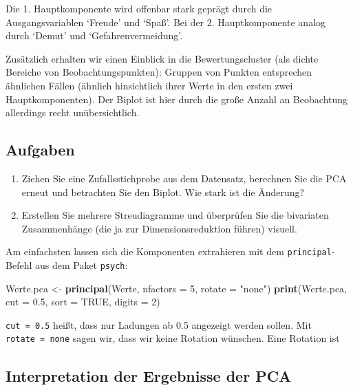 \documentclass[12pt,ngerman,]{book}
\makeatletter
\newenvironment{Shaded}{\begin{snugshade}}{\end{snugshade}}
\newcommand{\KeywordTok}[1]{\textcolor[rgb]{0.13,0.29,0.53}{\textbf{#1}}}
\newcommand{\DataTypeTok}[1]{\textcolor[rgb]{0.13,0.29,0.53}{#1}}
\newcommand{\DecValTok}[1]{\textcolor[rgb]{0.00,0.00,0.81}{#1}}
\newcommand{\FloatTok}[1]{\textcolor[rgb]{0.00,0.00,0.81}{#1}}
\newcommand{\StringTok}[1]{\textcolor[rgb]{0.31,0.60,0.02}{#1}}
\newcommand{\OtherTok}[1]{\textcolor[rgb]{0.56,0.35,0.01}{#1}}
\newcommand{\NormalTok}[1]{#1}
\newenvironment{kframe}{%
\medskip{}
\setlength{\fboxsep}{.8em}
 \def\at@end@of@kframe{}%
 \ifinner\ifhmode%
  \def\at@end@of@kframe{\end{minipage}}%
  \begin{minipage}{\columnwidth}%
 \fi\fi%
 \def\FrameCommand##1{\hskip\@totalleftmargin \hskip-\fboxsep
 \colorbox{shadecolor}{##1}\hskip-\fboxsep
     \hskip-\linewidth \hskip-\@totalleftmargin \hskip\columnwidth}%
 \MakeFramed {\advance\hsize-\width
   \@totalleftmargin\z@ \linewidth\hsize
   \@setminipage}}%
 {\par\unskip\endMakeFramed%
 \at@end@of@kframe}
\renewenvironment{Shaded}{\begin{kframe}}{\end{kframe}}
\theoremstyle{definition}
\theoremstyle{definition}
\theoremstyle{remark}
\let\BeginKnitrBlock\begin \let\EndKnitrBlock\end
\makeatother
\begin{document}
Die 1. Hauptkomponente wird offenbar stark geprägt durch die
Ausgangsvariablen `Freude' und `Spaß'. Bei der 2. Hauptkomponente analog
durch `Demut' und `Gefahrenvermeidung'.

Zusätzlich erhalten wir einen Einblick in die Bewertungscluster (als
dichte Bereiche von Beobachtungspunkten): Gruppen von Punkten
entsprechen ähnlichen Fällen (ähnlich hinsichtlich ihrer Werte in den
ersten zwei Hauptkomponenten). Der Biplot ist hier durch die große
Anzahl an Beobachtung allerdings recht unübersichtlich.

\subsection{Aufgaben}\label{aufgaben-16}

\BeginKnitrBlock{rmdexercises}
\begin{enumerate}
\def\labelenumi{\arabic{enumi}.}
\item
  Ziehen Sie eine Zufallsstichprobe aus dem Datensatz, berechnen Sie die
  PCA erneut und betrachten Sie den Biplot. Wie stark ist die Änderung?
\item
  Erstellen Sie mehrere Streudiagramme und überprüfen Sie die bivariaten
  Zusammenhänge (die ja zur Dimensionsreduktion führen) visuell.
\end{enumerate}
\EndKnitrBlock{rmdexercises}

Am einfachsten lassen sich die Komponenten extrahieren mit dem
\texttt{principal}-Befehl aus dem Paket \texttt{psych}:

\begin{Shaded}
\begin{Highlighting}[]
\NormalTok{Werte.pca <-}\StringTok{ }\KeywordTok{principal}\NormalTok{(Werte, }\DataTypeTok{nfactors =} \DecValTok{5}\NormalTok{, }\DataTypeTok{rotate =} \StringTok{"none"}\NormalTok{)}
\KeywordTok{print}\NormalTok{(Werte.pca, }\DataTypeTok{cut =} \FloatTok{0.5}\NormalTok{, }\DataTypeTok{sort =} \OtherTok{TRUE}\NormalTok{, }\DataTypeTok{digits =} \DecValTok{2}\NormalTok{)}
\end{Highlighting}
\end{Shaded}

\texttt{cut\ =\ 0.5} heißt, dass nur Ladungen ab 0.5 angezeigt werden
sollen. Mit \texttt{rotate\ =\ \textquotesingle{}none\textquotesingle{}}
sagen wir, dass wir keine Rotation wünschen. Eine Rotation ist

\subsection{Interpretation der Ergebnisse der
PCA}\label{interpretation-der-ergebnisse-der-pca}
\end{document}
